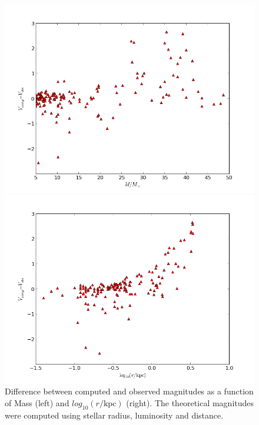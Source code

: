 \documentclass[a4paper,10pt]{article}
\begin{document}
 \begin{figure}[h!]
  \begin{minipage}{0.49\textwidth}
   \includegraphics[width=\textwidth]{diffmagmass}
  \end{minipage}
  \begin{minipage}{0.49\textwidth}
   \includegraphics[width=\textwidth]{diffmaglogdist}
  \end{minipage}
 \caption{Difference between computed and observed magnitudes as a function of Mass (left) and $log_{10}(r/\mathrm{kpc})$ (right).
 The theoretical magnitudes were computed using stellar radius, luminosity and distance. \label{massdist}}
 \end{figure}
 
\end{document}
